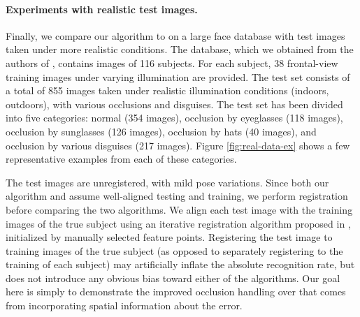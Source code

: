 \paragraph{Experiments with realistic test images.} Finally, we compare our algorithm to \cite{Wright2009-PAMI} on a large face database with test images taken under more realistic conditions. The database, which we obtained from the authors of \cite{WagnerA2009-CVPR}, contains images of 116 subjects. For each subject, 38 frontal-view training images under varying illumination are provided. The test set consists of a total of 855 images taken under realistic illumination conditions (indoors, outdoors), with various occlusions and disguises. The test set has been divided into five categories: normal (354 images), occlusion by eyeglasses (118 images), occlusion by sunglasses (126 images), occlusion by hats (40 images), and occlusion by various disguises (217 images). Figure \ref{fig:real-data-ex} shows a few representative examples from each of these categories.

The test images are unregistered, with mild pose variations. Since both our algorithm and \cite{Wright2009-PAMI}
assume well-aligned testing and training, we perform registration before comparing the two algorithms. We align each
test image with the training images of the true subject using an iterative registration algorithm proposed in
\cite{WagnerA2009-CVPR}, initialized by manually selected feature points. Registering the test image to training images of the true subject (as opposed to separately registering to the training of each subject) may artificially inflate the absolute recognition rate, but does not introduce any obvious bias toward either of the algorithms. Our goal here is simply to demonstrate the improved occlusion handling over \cite{Wright2009-PAMI} that comes from incorporating spatial information about the error.

